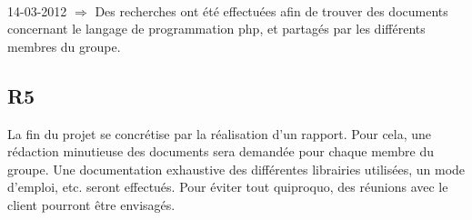 \documentclass[a4paper,11pt,french]{article}
\begin{document}
\paragraph{}
14-03-2012 $\Rightarrow$ Des recherches ont été effectuées afin de trouver des
documents concernant le langage de programmation php, et partagés par les
différents membres du groupe.

\subsection*{R5}
La fin du projet se concrétise par la réalisation d’un rapport. Pour cela, une
rédaction minutieuse des documents sera demandée pour chaque membre du groupe.
Une documentation exhaustive des différentes librairies utilisées, un mode
d’emploi, etc. seront effectués. Pour éviter tout quiproquo, des réunions avec
le client pourront être envisagés.
\end{document}
